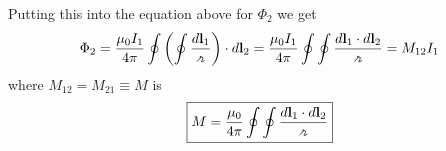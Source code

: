Putting this into the equation above for \(\Phi _2\) we get \begin{align*}
    \Phi_2 = \frac{\mu _0 I_1}{4 \pi }\oint \left( \oint \frac{d \mathbf{l}_1}{\griffr[2] } \right) \cdot d \mathbf{l}_2 = \frac{\mu _0 I_1}{4 \pi } \oint\oint \frac{d \mathbf{l}_1 \cdot d \mathbf{l}_2}{\griffr[2] } = M_{12} I_1 
\end{align*}
where \(M_{12} = M_{21} \equiv M\) is  \begin{align*}
    \boxed{M = \frac{\mu _0}{4 \pi } \oint\oint \frac{d \mathbf{l}_1 \cdot d \mathbf{l}_2}{\griffr[2] }}
\end{align*}
